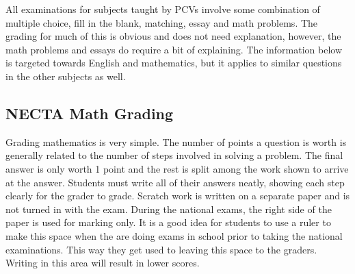       All examinations for subjects taught by PCVs involve some combination of multiple choice, fill in the blank, matching, essay and math problems.  The grading for much of this is obvious and does not need explanation, however, the math problems and essays do require a bit of explaining.  The information below is targeted towards English and mathematics, but it applies to similar questions in the other subjects as well. 
      
\subsection{NECTA Math Grading} 
      Grading mathematics is very simple.  The number of points a question is worth is generally related to the number of steps involved in solving a problem.  The final answer is only worth 1 point and the rest is split among the work shown to arrive at the answer.  Students must write all of their answers neatly, showing each step clearly for the grader to grade.  Scratch work is written on a separate paper and is not turned in with the exam.  During the national exams, the right side of the paper is used for marking only.  It is a good idea for students to use a ruler to make this space when the are doing exams in school prior to taking the national examinations. This way they get used to leaving this space to the graders.  Writing in this area will result in lower scores. 

